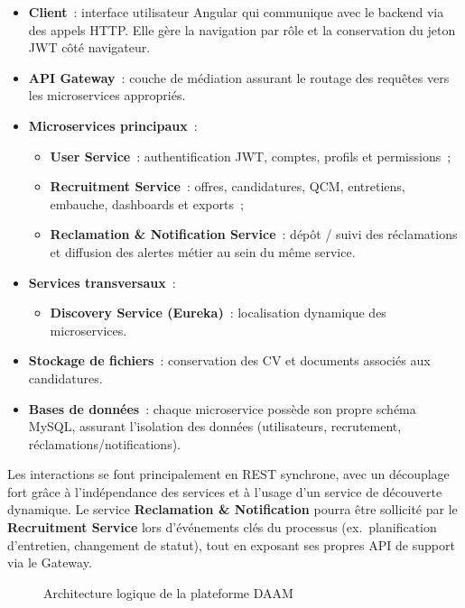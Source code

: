 \begin{itemize}
  \item \textbf{Client}~: interface utilisateur Angular qui communique avec
        le backend via des appels HTTP. Elle gère la navigation par rôle
        et la conservation du jeton JWT côté navigateur.
  \item \textbf{API Gateway}~: couche de médiation assurant le routage
        des requêtes vers les microservices appropriés.
  \item \textbf{Microservices principaux}~:
        \begin{itemize}
          \item \textbf{User Service}~: authentification JWT, comptes,
                profils et permissions~;
          \item \textbf{Recruitment Service}~: offres, candidatures, QCM,
                entretiens, embauche, dashboards et exports~;
          \item \textbf{Reclamation \& Notification Service}~: dépôt /
                suivi des réclamations et diffusion des alertes métier
                au sein du même service.
        \end{itemize}
  \item \textbf{Services transversaux}~:
        \begin{itemize}
          \item \textbf{Discovery Service (Eureka)}~: localisation
                dynamique des microservices.
        \end{itemize}
  \item \textbf{Stockage de fichiers}~: conservation des CV et documents
        associés aux candidatures.
  \item \textbf{Bases de données}~: chaque microservice possède son
        propre schéma MySQL, assurant l'isolation des données
        (utilisateurs, recrutement, réclamations/notifications).
\end{itemize}

Les interactions se font principalement en REST synchrone, avec un
découplage fort grâce à l'indépendance des services et à l'usage
d'un service de découverte dynamique. Le service
\textbf{Reclamation \& Notification} pourra être sollicité par le
\textbf{Recruitment Service} lors d'événements clés du processus
(ex.~planification d'entretien, changement de statut), tout en exposant
ses propres API de support via le Gateway.

\begin{figure}[htbp]
  \centering
  \caption{Architecture logique de la plateforme DAAM}
  \label{fig:arch-logic}
\end{figure}


